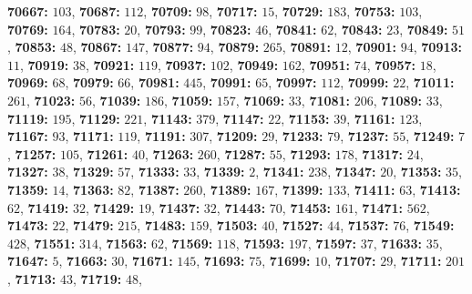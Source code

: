 \textsf{\bfseries 70667:} $103$, \textsf{\bfseries 70687:} $112$, \textsf{\bfseries 70709:} $98$, \textsf{\bfseries 70717:} $15$, \textsf{\bfseries 70729:} $183$, \textsf{\bfseries 70753:} $103$, \textsf{\bfseries 70769:} $164$, \textsf{\bfseries 70783:} $20$, \textsf{\bfseries 70793:} $99$, \textsf{\bfseries 70823:} $46$, \textsf{\bfseries 70841:} $62$, \textsf{\bfseries 70843:} $23$, \textsf{\bfseries 70849:} $51$, \textsf{\bfseries 70853:} $48$, \textsf{\bfseries 70867:} $147$, \textsf{\bfseries 70877:} $94$, \textsf{\bfseries 70879:} $265$, \textsf{\bfseries 70891:} $12$, \textsf{\bfseries 70901:} $94$, \textsf{\bfseries 70913:} $11$, \textsf{\bfseries 70919:} $38$, \textsf{\bfseries 70921:} $119$, \textsf{\bfseries 70937:} $102$, \textsf{\bfseries 70949:} $162$, \textsf{\bfseries 70951:} $74$, \textsf{\bfseries 70957:} $18$, \textsf{\bfseries 70969:} $68$, \textsf{\bfseries 70979:} $66$, \textsf{\bfseries 70981:} $445$, \textsf{\bfseries 70991:} $65$, \textsf{\bfseries 70997:} $112$, \textsf{\bfseries 70999:} $22$, \textsf{\bfseries 71011:} $261$, \textsf{\bfseries 71023:} $56$, \textsf{\bfseries 71039:} $186$, \textsf{\bfseries 71059:} $157$, \textsf{\bfseries 71069:} $33$, \textsf{\bfseries 71081:} $206$, \textsf{\bfseries 71089:} $33$, \textsf{\bfseries 71119:} $195$, \textsf{\bfseries 71129:} $221$, \textsf{\bfseries 71143:} $379$, \textsf{\bfseries 71147:} $22$, \textsf{\bfseries 71153:} $39$, \textsf{\bfseries 71161:} $123$, \textsf{\bfseries 71167:} $93$, \textsf{\bfseries 71171:} $119$, \textsf{\bfseries 71191:} $307$, \textsf{\bfseries 71209:} $29$, \textsf{\bfseries 71233:} $79$, \textsf{\bfseries 71237:} $55$, \textsf{\bfseries 71249:} $7$, \textsf{\bfseries 71257:} $105$, \textsf{\bfseries 71261:} $40$, \textsf{\bfseries 71263:} $260$, \textsf{\bfseries 71287:} $55$, \textsf{\bfseries 71293:} $178$, \textsf{\bfseries 71317:} $24$, \textsf{\bfseries 71327:} $38$, \textsf{\bfseries 71329:} $57$, \textsf{\bfseries 71333:} $33$, \textsf{\bfseries 71339:} $2$, \textsf{\bfseries 71341:} $238$, \textsf{\bfseries 71347:} $20$, \textsf{\bfseries 71353:} $35$, \textsf{\bfseries 71359:} $14$, \textsf{\bfseries 71363:} $82$, \textsf{\bfseries 71387:} $260$, \textsf{\bfseries 71389:} $167$, \textsf{\bfseries 71399:} $133$, \textsf{\bfseries 71411:} $63$, \textsf{\bfseries 71413:} $62$, \textsf{\bfseries 71419:} $32$, \textsf{\bfseries 71429:} $19$, \textsf{\bfseries 71437:} $32$, \textsf{\bfseries 71443:} $70$, \textsf{\bfseries 71453:} $161$, \textsf{\bfseries 71471:} $562$, \textsf{\bfseries 71473:} $22$, \textsf{\bfseries 71479:} $215$, \textsf{\bfseries 71483:} $159$, \textsf{\bfseries 71503:} $40$, \textsf{\bfseries 71527:} $44$, \textsf{\bfseries 71537:} $76$, \textsf{\bfseries 71549:} $428$, \textsf{\bfseries 71551:} $314$, \textsf{\bfseries 71563:} $62$, \textsf{\bfseries 71569:} $118$, \textsf{\bfseries 71593:} $197$, \textsf{\bfseries 71597:} $37$, \textsf{\bfseries 71633:} $35$, \textsf{\bfseries 71647:} $5$, \textsf{\bfseries 71663:} $30$, \textsf{\bfseries 71671:} $145$, \textsf{\bfseries 71693:} $75$, \textsf{\bfseries 71699:} $10$, \textsf{\bfseries 71707:} $29$, \textsf{\bfseries 71711:} $201$, \textsf{\bfseries 71713:} $43$, \textsf{\bfseries 71719:} $48$, 
